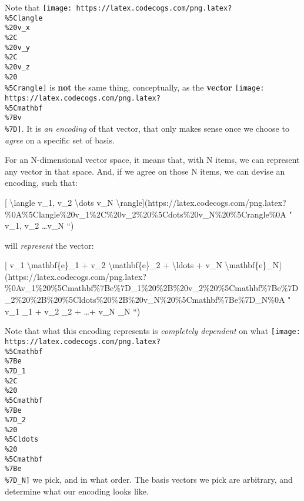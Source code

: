 \documentclass[]{article}
\begin{document}
Note that
\texttt{[image: https://latex.codecogs.com/png.latex?\\\%5Clangle\\\%20v\_x\\\%2C\\\%20v\_y\\\%2C\\\%20v\_z\\\%20\\\%5Crangle]}
is \textbf{not} the same thing, conceptually, as the \textbf{vector}
\texttt{[image: https://latex.codecogs.com/png.latex?\\\%5Cmathbf\\\%7Bv\\\%7D]}. It
is \emph{an encoding} of that vector, that only makes sense once we choose to
\emph{agree} on a specific set of basis.

For an N-dimensional vector space, it means that, with N items, we can represent
any vector in that space. And, if we agree on those N items, we can devise an
encoding, such that:

{[} \textbackslash{}langle v\_1, v\_2 \textbackslash{}dots v\_N
\textbackslash{}rangle{]}(https://latex.codecogs.com/png.latex?\%0A\%5Clangle\%20v\_1\%2C\%20v\_2\%20\%5Cdots\%20v\_N\%20\%5Crangle\%0A
" \langle v\_1, v\_2 \dots v\_N \rangle ``)

will \emph{represent} the vector:

{[} v\_1 \textbackslash{}mathbf\{e\}\_1 + v\_2 \textbackslash{}mathbf\{e\}\_2 +
\textbackslash{}ldots + v\_N
\textbackslash{}mathbf\{e\}\_N{]}(https://latex.codecogs.com/png.latex?\%0Av\_1\%20\%5Cmathbf\%7Be\%7D\_1\%20\%2B\%20v\_2\%20\%5Cmathbf\%7Be\%7D\_2\%20\%2B\%20\%5Cldots\%20\%2B\%20v\_N\%20\%5Cmathbf\%7Be\%7D\_N\%0A
" v\_1 \_1 + v\_2 \_2 + \ldots + v\_N \_N ``)

Note that what this encoding represents is \emph{completely dependent} on what
\texttt{[image: https://latex.codecogs.com/png.latex?\\\%5Cmathbf\\\%7Be\\\%7D\_1\\\%2C\\\%20\\\%5Cmathbf\\\%7Be\\\%7D\_2\\\%20\\\%5Cldots\\\%20\\\%5Cmathbf\\\%7Be\\\%7D\_N]}
we pick, and in what order. The basis vectors we pick are arbitrary, and
determine what our encoding looks like.
\end{document}
